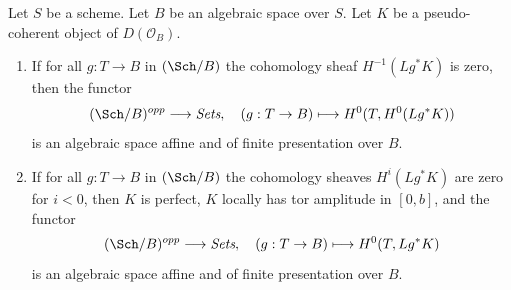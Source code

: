 %
\begin{lemma}
\label{lemma-cohomology-perfect-complex}
Let $S$ be a scheme. Let $B$ be an algebraic space over $S$.
Let $K$ be a pseudo-coherent object of $D(\mathcal{O}_B)$.
\begin{enumerate}
\item If for all $g : T \to B$ in $(\Sch/B)$ the cohomology sheaf
$H^{-1}(Lg^*K)$ is zero, then the functor
$$
(\Sch/B)^{opp} \longrightarrow \textit{Sets},\quad
(g : T \to B) \longmapsto H^0(T, H^0(Lg^*K))
$$
is an algebraic space affine and of finite presentation over $B$.
\item If for all $g : T \to B$ in $(\Sch/B)$ the cohomology sheaves
$H^i(Lg^*K)$ are zero for $i < 0$, then $K$ is perfect,
$K$ locally has tor amplitude in $[0, b]$, and the functor
$$
(\Sch/B)^{opp} \longrightarrow \textit{Sets},\quad
(g : T \to B) \longmapsto H^0(T, Lg^*K)
$$
is an algebraic space affine and of finite presentation over $B$.
\end{enumerate}
\end{lemma}

